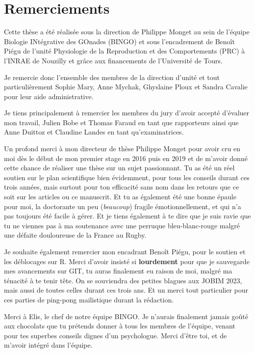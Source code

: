\chapter*{Remerciements}
\thispagestyle{empty}
\onehalfspacing

\par Cette thèse a été réalisée sous la direction de Philippe Monget au sein de l’équipe Biologie INtégrative des GOnades (BINGO) et sous l’encadrement de Benoît Piégu de l’unité Physiologie de la Reproduction et des Comportements (PRC) à l’INRAE de Nouzilly et grâce aux financements de l’Université de Tours. 
\par Je remercie donc l’ensemble des membres de la direction d’unité et tout particulièrement Sophie Mary, Anne Mychak, Ghyslaine Ploux et Sandra Cavalie pour leur aide administrative.
\par Je tiens principalement à remercier les membres du jury d’avoir accepté d’évaluer mon travail, Julien Bobe et Thomas Faraud en tant que rapporteurs ainsi que Anne Duittoz et Claudine Landes en tant qu’examinatrices. 
\par Un profond merci à mon directeur de thèse Philippe Monget pour avoir cru en moi dès le début de mon premier stage en 2016 puis en 2019 et de m’avoir donné cette chance de réaliser une thèse sur un sujet passionnant. Tu as été un réel soutien sur le plan scientifique bien évidemment, pour tous les conseils durant ces trois années, mais surtout pour ton efficacité sans nom dans les retours que ce soit sur les articles ou ce manuscrit. Et tu as également été une bonne épaule pour moi, la doctorante un peu (\textit{beaucoup}) fragile émotionnellement, et qui n’a pas toujours été facile à gérer. Et je tiens également à te dire que je suis ravie que tu ne viennes pas à ma soutenance avec une perruque bleu-blanc-rouge malgré une défaite douloureuse de la France au Rugby. 
\par Je souhaite également remercier mon encadrant Benoît Piégu, pour le soutien et les déblocages sur R. Merci d’avoir insisté si \textbf{lourdement} pour que je sauvegarde mes avancements sur GIT, tu auras finalement eu raison de moi, malgré ma ténacité à te tenir tête. On se souviendra des petites blagues aux JOBIM 2023, mais aussi de toutes celles durant ces trois ans. Et un merci tout particulier pour ces parties de ping-pong mailistique durant la rédaction.
\par Merci à Elis, le chef de notre équipe BINGO. Je n’aurais finalement jamais goûté aux chocolats que tu prétends donner à tous les membres de l’équipe, venant pour tes superbes conseils dignes d’un psychologue. Merci d’être toi, et de m’avoir intégré dans l’équipe.
